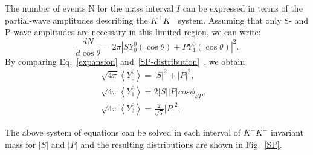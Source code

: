 {    The number of events N for the mass interval $I$ can be expressed in terms of the partial-wave amplitudes describing the $K^{+}K^{-}$ system. Assuming that only S- and P-wave amplitudes are necessary in this limited region, we can write:
    \begin{equation}
        \frac{dN}{d\cos\theta} = 2\pi\left|SY_{0}^{0}(\cos\theta) + PY_{1}^{0}(\cos\theta)\right|^{2}.\label{SP-distribution}
    \end{equation}
    By comparing Eq.~\ref{expansion} and~\ref{SP-distribution}~\cite{PRD56-7299}, we obtain 
    \begin{equation}
        \begin{array}{lr}
            \sqrt{4\pi}\left\langle Y_{0}^{0}\right\rangle = \left|S\right|^{2} + \left|P\right|^{2}, &\\ 
            \sqrt{4\pi}\left\langle Y_{1}^{0}\right\rangle = 2\left|S\right|\left|P\right|cos\phi_{SP}, &\\ 
            \sqrt{4\pi}\left\langle Y_{2}^{0}\right\rangle = \frac{2}{\sqrt{5}}\left|P\right|^{2}, &
        \end{array}\label{SP-RES} 
    \end{equation}

}


\par{
    The above system of equations can be solved in each interval of $K^{+}K^{-}$ invariant mass for $\left|S\right|$ and $\left|P\right|$ and the resulting distributions are shown in Fig.~\ref{SP}. 
    
}


